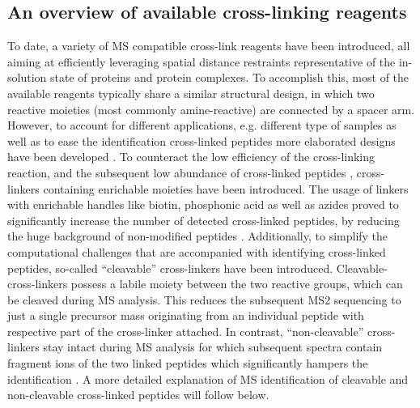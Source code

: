 \subsection*{An overview of available cross-linking reagents}
To date, a variety of MS compatible cross-link reagents have been introduced, all aiming at efficiently leveraging spatial distance restraints representative of the in-solution state of proteins and protein complexes. To accomplish this, most of the available reagents typically share a similar structural design, in which two reactive moieties (most commonly amine-reactive) are connected by a spacer arm. However, to account for different applications, e.g. different type of samples as well as to ease the identification cross-linked peptides more elaborated designs have been developed \cite{Steigenberger_2020}. To counteract the low efficiency of the cross-linking reaction, and the subsequent low abundance of cross-linked peptides \cite{Leitner_2014, Leitner_2010}, cross-linkers containing enrichable moieties have been introduced. The usage of linkers with enrichable handles like biotin, phosphonic acid as well as azides proved to significantly increase the number of detected cross-linked peptides, by reducing the huge background of non-modified peptides \cite{Matzinger_2020, Steigenberger_2019, Tan_2016}. Additionally, to simplify the computational challenges that are accompanied with identifying cross-linked peptides, so-called “cleavable” cross-linkers have been introduced. Cleavable-cross-linkers possess a labile moiety between the two reactive groups, which can be cleaved during MS analysis. This reduces the subsequent MS2 sequencing to just a single precursor mass originating from an individual peptide with respective part of the cross-linker attached. In contrast, “non-cleavable” cross-linkers stay intact during MS analysis for which subsequent spectra contain fragment ions of the two linked peptides which significantly hampers the identification \cite{Kao_2011}. A more detailed explanation of MS identification of cleavable and non-cleavable cross-linked peptides will follow below.

